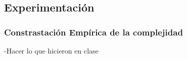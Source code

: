 \documentclass[a4paper]{article}
\begin{document}
\subsection{Experimentaci\'on}


\subsubsection{Constrastaci\'on Emp\'irica de la complejidad}
-Hacer lo que hicieron en clase\\
\newpage












\end{document}
